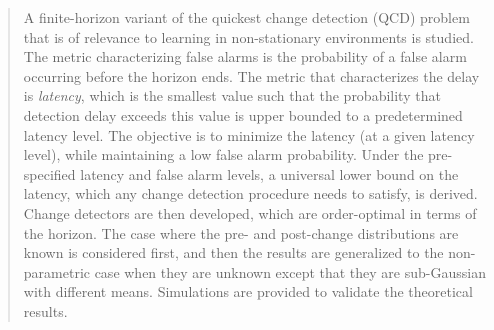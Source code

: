 \documentclass[12pt]{interact}
\theoremstyle{plain}
\newcommand{\vvv}[1]{{\color{red}{#1}}}
\begin{document}
\begin{abstract}



A finite-horizon variant of the quickest change detection (QCD) problem that is of relevance to learning in non-stationary environments is studied. The metric characterizing false alarms is the probability of a false alarm occurring before the horizon ends. The metric that characterizes the delay is \emph{latency}, which is the smallest value such that the probability that detection delay exceeds this value is upper bounded to a predetermined latency level.
The objective is to minimize the latency (at a given latency level), while maintaining a low false alarm probability. Under  the pre-specified latency and false alarm levels, a universal lower bound on the latency, which any change detection procedure needs to satisfy, is derived. Change detectors are then developed, which are order-optimal in terms of the horizon. 
The case where the pre- and post-change distributions are known is considered first, and then the results are generalized to the non-parametric  case when they are unknown except that they are  sub-Gaussian with different means.  Simulations are provided to validate the theoretical results.


\end{abstract}
\end{document}
